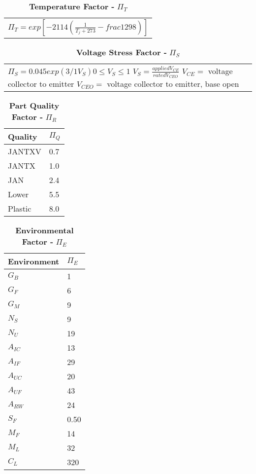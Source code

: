 \begin{table}
\caption{\textbf{Temperature Factor -} $\Pi_{T}$}
\label{table:tempFactorTransSlow}
\begin{tabular}{l} 
$\Pi_{T} = exp[-2114(\frac{1}{T_{j} + 273} - frac{1}{298})]$
\end{tabular}
\end{table}

\begin{table}
\caption{\textbf{Voltage Stress Factor -} $\Pi_{S}$}
\label{table:voltStressFactorTransSlow}
\begin{tabular}{l} 
$\Pi_{S} = 0.045exp(3/1V_{S}) 0 \leq V_{S} \leq 1$
$V_{S} = \frac{applied V_{CE}}{rated V_{CEO}}$
$V_{CE} =$ voltage collector to emitter
$V_{CEO} = $ voltage collector to emitter, base open
\end{tabular}
\end{table}

\begin{table}
\caption{\textbf{Part Quality Factor -} $\Pi_{R}$}
\label{table:partQualityFactorTransSlow}
\begin{tabular}{|l|m{10cm}|} \hline
\textbf{Quality} & $\Pi_{Q}$ \\ \hline
JANTXV & 0.7 \\ \hline
JANTX & 1.0 \\ \hline
JAN & 2.4 \\ \hline
Lower & 5.5 \\ \hline
Plastic & 8.0 \\ \hline
\end{tabular}
\end{table}


\begin{table}
\caption{\textbf{Environmental Factor -} $\Pi_{E}$}
\label{table:enviroFactorTranSlow}
\begin{tabular}{|l|m{10cm}|} \hline
\textbf{Environment} & $\Pi_{E}$ \\ \hline
$G_{B}$ & 1 \\ \hline
$G_{F}$ & 6 \\ \hline
$G_{M}$ & 9 \\ \hline
$N_{S}$ & 9 \\ \hline
$N_{U}$ & 19 \\ \hline
$A_{IC}$ & 13 \\ \hline
$A_{IF}$ & 29 \\ \hline
$A_{UC}$ & 20 \\ \hline
$A_{UF}$ & 43 \\ \hline
$A_{RW}$ & 24 \\ \hline
$S_{F}$ & 0.50 \\ \hline
$M_{F}$ & 14 \\ \hline
$M_{L}$ & 32 \\ \hline
$C_{L}$ & 320 \\ \hline
\end{tabular}
\end{table}


